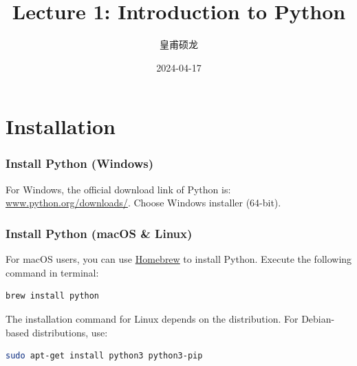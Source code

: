 \documentclass[beamer, en, version=2.0]{huangfusl-template}
\title{Lecture 1: Introduction to Python}
\author{皇甫硕龙}
\date{2024-04-17}
\begin{document}
    \begin{frame}[fragile]
        \maketitle
    \end{frame}
    \section{Installation}
    \begin{frame}[fragile]
        \frametitle{Install Python (Windows)}

        For Windows, the official download link of Python is: {\footnotesize \url{www.python.org/downloads/}}. Choose {\color{darkblue} Windows installer (64-bit)}.


    \end{frame}
    \begin{frame}[fragile]
        \frametitle{Install Python (macOS \& Linux)}

        For macOS users, you can use \href{https://github.com/Homebrew/install}{\color{darkblue} Homebrew} to install Python. Execute the following command in terminal:

        \begin{lstlisting}[language=bash]
brew install python
        \end{lstlisting}

        The installation command for Linux depends on the distribution. For Debian-based distributions, use:

        \begin{lstlisting}[language=bash]
sudo apt-get install python3 python3-pip
        \end{lstlisting}

    \end{frame}
\end{document}
